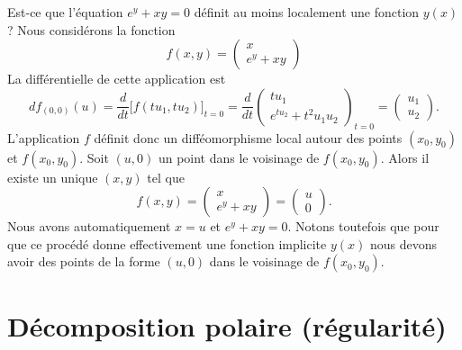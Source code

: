 \begin{example}
    Est-ce que l'équation \( e^{y}+xy=0\) définit au moins localement une fonction \( y(x)\) ? Nous considérons la fonction
    \begin{equation}
        f(x,y)=\begin{pmatrix}
            x    \\
            e^{y}+xy
        \end{pmatrix}
    \end{equation}
    La différentielle de cette application est
    \begin{equation}
            df_{(0,0)}(u)=\frac{ d }{ dt }\Big[ f(tu_1,tu_2) \Big]_{t=0}
            =\frac{ d }{ dt }\begin{pmatrix}
                tu_1    \\
                e^{tu_2}+t^2u_1u_2
            \end{pmatrix}_{t=0}
            =\begin{pmatrix}
                u_1    \\
                u_2
            \end{pmatrix}.
    \end{equation}
    L'application \( f\) définit donc un difféomorphisme local autour des points \( (x_0,y_0)\) et \( f(x_0,y_0)\). Soit \( (u,0)\) un point dans le voisinage de \( f(x_0,y_0)\). Alors il existe un unique \( (x,y)\) tel que
    \begin{equation}
        f(x,y)=\begin{pmatrix}
               x \\
            e^y+xy
        \end{pmatrix}=
        \begin{pmatrix}
            u    \\
            0
        \end{pmatrix}.
    \end{equation}
    Nous avons automatiquement \( x=u\) et \( e^y+xy=0\). Notons toutefois que pour que ce procédé donne effectivement une fonction implicite \( y(x)\) nous devons avoir des points de la forme \( (u,0)\) dans le voisinage de \( f(x_0,y_0)\).
\end{example}


\section{Décomposition polaire (régularité)}

